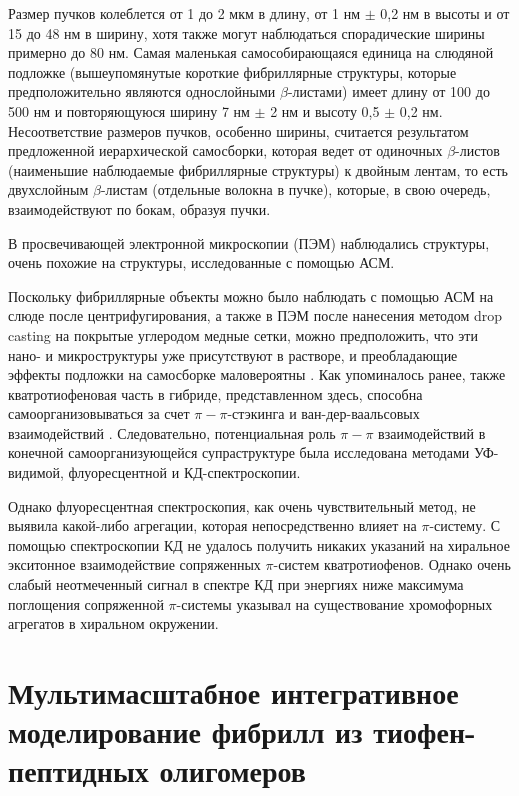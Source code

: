     Размер пучков колеблется от 1 до 2 мкм в длину, от 1 нм $\pm$ 0,2 нм в высоты и от 15 до 48 нм в ширину, хотя также могут наблюдаться спорадические ширины примерно до 80 нм. Самая маленькая самособирающаяся единица на слюдяной подложке (вышеупомянутые короткие фибриллярные структуры, которые предположительно являются однослойными $\beta$-листами) имеет длину от 100 до 500 нм и повторяющуюся ширину 7 нм $\pm$ 2 нм и высоту 0,5 $\pm$ 0,2 нм. Несоответствие размеров пучков, особенно ширины, считается результатом предложенной иерархической самосборки, которая ведет от одиночных $\beta$-листов (наименьшие наблюдаемые фибриллярные структуры) к двойным лентам, то есть двухслойным $\beta$-листам (отдельные волокна в пучке), которые, в свою очередь, взаимодействуют по бокам, образуя пучки.
    
    В просвечивающей электронной микроскопии (ПЭМ) наблюдались структуры, очень похожие на структуры, исследованные с помощью АСМ.

    Поскольку фибриллярные объекты можно было наблюдать с помощью АСМ на слюде после центрифугирования, а также в ПЭМ после нанесения методом drop casting на покрытые углеродом медные сетки, можно предположить, что эти нано- и микроструктуры уже присутствуют в растворе, и преобладающие эффекты подложки на самосборке маловероятны \cite{schillinger_oligothiophene_2009}. Как упоминалось ранее, также кватротиофеновая часть в гибриде, представленном здесь, способна самоорганизовываться за счет $\pi - \pi$-стэкинга и ван-дер-ваальсовых взаимодействий \cite{azumi_coincidence_2000,bauerle_oligothiophenes_1995,mena-osteritz_superstructures_2002}. Следовательно, потенциальная роль $\pi - \pi$ взаимодействий в конечной самоорганизующейся супраструктуре была исследована методами УФ-видимой, флуоресцентной и КД-спектроскопии.
    
    Однако флуоресцентная спектроскопия, как очень чувствительный метод, не выявила какой-либо агрегации, которая непосредственно влияет на $\pi$-систему. С помощью спектроскопии КД не удалось получить никаких указаний на хиральное экситонное взаимодействие сопряженных $\pi$-систем кватротиофенов. Однако очень слабый неотмеченный сигнал в спектре КД при энергиях ниже максимума поглощения сопряженной $\pi$-системы указывал на существование хромофорных агрегатов в хиральном окружении.



\section{Мультимасштабное интегративное моделирование фибрилл из тиофен-пептидных олигомеров}

